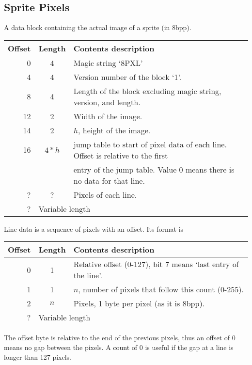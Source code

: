 \documentclass{article}
\begin{document}
\subsection{Sprite Pixels}
A data block containing the actual image of a sprite (in 8bpp).

\begin{center}
\begin{tabular}{|r|c|l|} \hline
\textbf{Offset} & \textbf{Length} & \textbf{Contents description} \\ \hline
 0 & 4 & Magic string `8PXL' \\
 4 & 4 & Version number of the block `1'. \\
 8 & 4 & Length of the block excluding magic string, version, and length. \\
12 & 2 & Width of the image. \\
14 & 2 & $h$, height of the image. \\
16 & $4*h$ & jump table to start of pixel data of each line. Offset is relative to the first \\
   &       & entry of the jump table. Value 0 means there is no data for that line. \\
 ? &    ?  & Pixels of each line. \\ \hline
 ? & \multicolumn{2}{l|}{Variable length} \\ \hline
\end{tabular}
\end{center}

Line data is a sequence of pixels with an offset. Its format is

\begin{center}
\begin{tabular}{|r|c|l|} \hline
\textbf{Offset} & \textbf{Length} & \textbf{Contents description} \\ \hline
 0 & 1 & Relative offset (0-127), bit 7 means `last entry of the line'. \\
 1 & 1 & $n$, number of pixels that follow this count (0-255). \\
 2 & $n$ & Pixels, 1 byte per pixel (as it is 8bpp). \\ \hline
 ? & \multicolumn{2}{l|}{Variable length} \\ \hline
\end{tabular}
\end{center}

The offset byte is relative to the end of the previous pixels, thus an offset
of 0 means no gap between the pixels. A count of 0 is useful if the gap at a
line is longer than 127 pixels.
\end{document}
